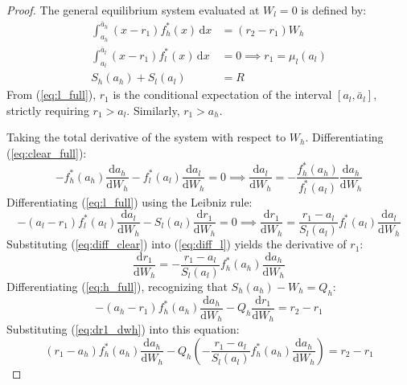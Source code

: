 \documentclass[12pt, a4paper]{article}
\begin{document}
\begin{proof}
The general equilibrium system evaluated at $W_l=0$ is defined by:
\begin{align}
    \int_{a_h}^{\bar{a}_h} (x - r_1) f_h^*(x) \, \mathrm{d}x &= (r_2 - r_1)W_h \label{eq:h_full} \\
    \int_{a_l}^{\bar{a}_l} (x - r_1) f_l^*(x) \, \mathrm{d}x &= 0 \implies r_1 = \mu_l(a_l) \label{eq:l_full} \\
    S_h(a_h) + S_l(a_l) &= R \label{eq:clear_full}
\end{align}
From (\ref{eq:l_full}), $r_1$ is the conditional expectation of the interval $[a_l, \bar{a}_l]$, strictly requiring $r_1 > a_l$. Similarly, $r_1 > a_h$. 

Taking the total derivative of the system with respect to $W_h$.
Differentiating (\ref{eq:clear_full}):
\begin{equation}
    -f_h^*(a_h) \frac{\mathrm{d}a_h}{\mathrm{d}W_h} - f_l^*(a_l) \frac{\mathrm{d}a_l}{\mathrm{d}W_h} = 0 \implies \frac{\mathrm{d}a_l}{\mathrm{d}W_h} = -\frac{f_h^*(a_h)}{f_l^*(a_l)} \frac{\mathrm{d}a_h}{\mathrm{d}W_h} \label{eq:diff_clear}
\end{equation}
Differentiating (\ref{eq:l_full}) using the Leibniz rule:
\begin{equation}
    -(a_l - r_1)f_l^*(a_l) \frac{\mathrm{d}a_l}{\mathrm{d}W_h} - S_l(a_l) \frac{\mathrm{d}r_1}{\mathrm{d}W_h} = 0 \implies \frac{\mathrm{d}r_1}{\mathrm{d}W_h} = \frac{r_1 - a_l}{S_l(a_l)} f_l^*(a_l) \frac{\mathrm{d}a_l}{\mathrm{d}W_h} \label{eq:diff_l}
\end{equation}
Substituting (\ref{eq:diff_clear}) into (\ref{eq:diff_l}) yields the derivative of $r_1$:
\begin{equation}
    \frac{\mathrm{d}r_1}{\mathrm{d}W_h} = -\frac{r_1 - a_l}{S_l(a_l)} f_h^*(a_h) \frac{\mathrm{d}a_h}{\mathrm{d}W_h} \label{eq:dr1_dwh}
\end{equation}
Differentiating (\ref{eq:h_full}), recognizing that $S_h(a_h) - W_h = Q_h$:
\begin{equation}
    -(a_h - r_1)f_h^*(a_h) \frac{\mathrm{d}a_h}{\mathrm{d}W_h} - Q_h \frac{\mathrm{d}r_1}{\mathrm{d}W_h} = r_2 - r_1
\end{equation}
Substituting (\ref{eq:dr1_dwh}) into this equation:
\begin{equation}
    (r_1 - a_h) f_h^*(a_h) \frac{\mathrm{d}a_h}{\mathrm{d}W_h} - Q_h \left( -\frac{r_1 - a_l}{S_l(a_l)} f_h^*(a_h) \frac{\mathrm{d}a_h}{\mathrm{d}W_h} \right) = r_2 - r_1
\end{equation}

\end{proof}
\end{document}
